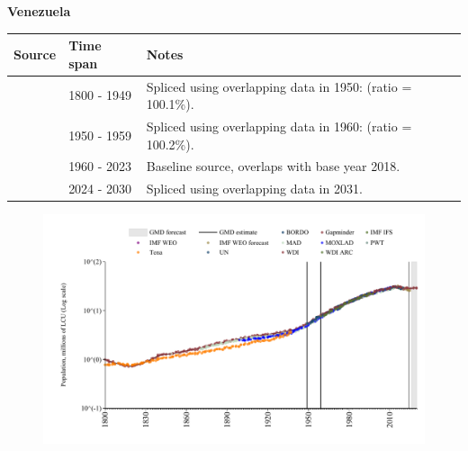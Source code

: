 \documentclass[12pt,a4paper,landscape]{article}
\begin{document}
\begin{adjustbox}{max totalsize={\paperwidth}{\paperheight},center}
\begin{minipage}[t][\textheight][t]{\textwidth}
\vspace*{0.5cm}
{}
\begin{center}
{\Large\bfseries Venezuela}
\end{center}
\vspace{0.5cm}
\begin{table}[H]
\centering
\small
\begin{tabular}{|l|l|l|}
\hline
\textbf{Source} & \textbf{Time span} & \textbf{Notes} \\
\hline
\rowcolor{white}\cite{Gapminder}& 1800 - 1949 &Spliced using overlapping data in 1950: (ratio = 100.1\%).\\
\rowcolor{lightgray}\cite{IMF_IFS}& 1950 - 1959 &Spliced using overlapping data in 1960: (ratio = 100.2\%).\\
\rowcolor{white}\cite{WDI}& 1960 - 2023 &Baseline source, overlaps with base year 2018.\\
\rowcolor{lightgray}\cite{Gapminder}& 2024 - 2030 &Spliced using overlapping data in 2031.\\
\hline
\end{tabular}
\end{table}
\begin{figure}[H]
\centering
\includegraphics[width=\textwidth,height=0.6\textheight,keepaspectratio]{graphs/VEN_pop.pdf}
\end{figure}
\end{minipage}
\end{adjustbox}
\end{document}

